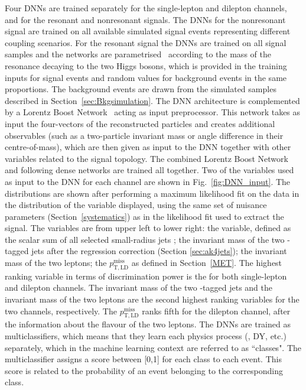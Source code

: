 Four DNNs are trained separately for the single-lepton and dilepton channels, and for the resonant and nonresonant signals. The DNNs for the nonresonant signal are trained on all available simulated signal events representing different coupling scenarios. For the resonant signal the DNNs are trained on all signal samples and the networks are parametrised~\cite{Baldi:2016fzo} according to the mass of the resonance decaying to the two Higgs bosons, which is provided in the training inputs for signal events and random values for background events in the same proportions. The background events are drawn from the simulated samples described in Section~\ref{sec:Bkgsimulation}.
The DNN architecture is complemented by a Lorentz Boost Network~\cite{LBN} acting as input preprocessor. This network takes as input the four-vectors of the reconstructed particles and creates additional observables (such as a two-particle invariant mass or angle difference in their centre-of-mass), which are then given as input to the DNN together with other variables related to the \HH signal topology. The combined Lorentz Boost Network and following dense networks are trained all together. Two of the variables used as input to the DNN for each channel are shown in Fig.~\ref{fig:DNN_input}. The distributions are shown after performing a maximum likelihood fit on the data in the distribution of the variable displayed, using the same set of nuisance parameters (Section~\ref{systematics}) as in the likelihood fit used to extract the signal. The variables are from upper left to lower right: the \HT variable, defined as the scalar sum of all selected small-radius jets \pt; the invariant mass of the two \Pbottom-tagged jets after the regression correction (Section \ref{sec:ak4jets}); the invariant mass of the two leptons; the $p_{\mathrm{T,LD}}^{\text{miss}}$ as defined in
Section~\ref{MET}. The highest ranking variable in terms of discrimination power is the \HT for both single-lepton and dilepton channels. The invariant mass of the two \Pbottom-tagged jets and the invariant mass of the two leptons are the second highest ranking variables for the two channels, respectively. The $p_{\mathrm{T,LD}}^{\text{miss}}$ ranks fifth for the dilepton channel, after the information about the flavour of the two leptons.
The DNNs are trained as multiclassifiers, which means that they learn each physics process (\ttbar, DY, etc.) separately, which in the machine learning context are referred to as ``classes". The multiclassifier assigns a score between [0,1] for each class to each event. This score is related to the probability of an event belonging to the corresponding class.

